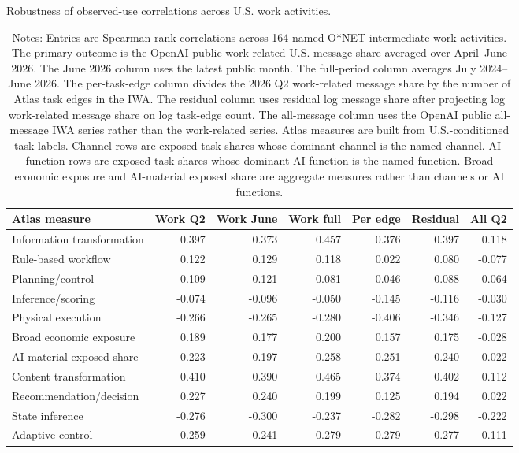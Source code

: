\begin{table}[!htbp]
\centering
\footnotesize
\caption{Robustness of observed-use correlations across U.S. work activities.}
\label{tab:appendix_openai_observed_use_iwa_robustness}
\begin{tabular}{lrrrrrr}
\toprule
Atlas measure & Work Q2 & Work June & Work full & Per edge & Residual & All Q2 \\
\midrule
Information transformation & 0.397 & 0.373 & 0.457 & 0.376 & 0.397 & 0.118 \\
Rule-based workflow & 0.122 & 0.129 & 0.118 & 0.022 & 0.080 & -0.077 \\
Planning/control & 0.109 & 0.121 & 0.081 & 0.046 & 0.088 & -0.064 \\
Inference/scoring & -0.074 & -0.096 & -0.050 & -0.145 & -0.116 & -0.030 \\
Physical execution & -0.266 & -0.265 & -0.280 & -0.406 & -0.346 & -0.127 \\
Broad economic exposure & 0.189 & 0.177 & 0.200 & 0.157 & 0.175 & -0.028 \\
AI-material exposed share & 0.223 & 0.197 & 0.258 & 0.251 & 0.240 & -0.022 \\
Content transformation & 0.410 & 0.390 & 0.465 & 0.374 & 0.402 & 0.112 \\
Recommendation/decision & 0.227 & 0.240 & 0.199 & 0.125 & 0.194 & 0.022 \\
State inference & -0.276 & -0.300 & -0.237 & -0.282 & -0.298 & -0.222 \\
Adaptive control & -0.259 & -0.241 & -0.279 & -0.279 & -0.277 & -0.111 \\
\bottomrule
\end{tabular}
\caption*{\scriptsize Notes: Entries are Spearman rank correlations across 164 named O*NET intermediate work activities. The primary outcome is the OpenAI public work-related U.S. message share averaged over April--June 2026. The June 2026 column uses the latest public month. The full-period column averages July 2024--June 2026. The per-task-edge column divides the 2026 Q2 work-related message share by the number of Atlas task edges in the IWA. The residual column uses residual log message share after projecting log work-related message share on log task-edge count. The all-message column uses the OpenAI public all-message IWA series rather than the work-related series. Atlas measures are built from U.S.-conditioned task labels. Channel rows are exposed task shares whose dominant channel is the named channel. AI-function rows are exposed task shares whose dominant AI function is the named function. Broad economic exposure and AI-material exposed share are aggregate measures rather than channels or AI functions.}
\end{table}
